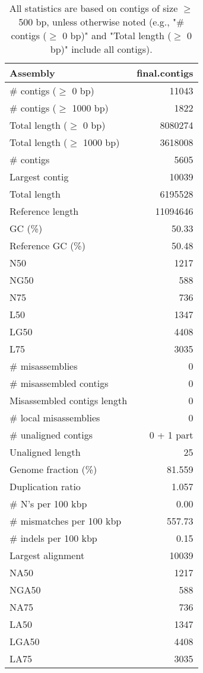 \documentclass[12pt,a4paper]{article}
\begin{document}
\begin{table}[ht]
\begin{center}
\caption{All statistics are based on contigs of size $\geq$ 500 bp, unless otherwise noted (e.g., "\# contigs ($\geq$ 0 bp)" and "Total length ($\geq$ 0 bp)" include all contigs).}
\begin{tabular}{|l*{1}{|r}|}
\hline
Assembly & final.contigs \\ \hline
\# contigs ($\geq$ 0 bp) & 11043 \\ \hline
\# contigs ($\geq$ 1000 bp) & 1822 \\ \hline
Total length ($\geq$ 0 bp) & 8080274 \\ \hline
Total length ($\geq$ 1000 bp) & 3618008 \\ \hline
\# contigs & 5605 \\ \hline
Largest contig & 10039 \\ \hline
Total length & 6195528 \\ \hline
Reference length & 11094646 \\ \hline
GC (\%) & 50.33 \\ \hline
Reference GC (\%) & 50.48 \\ \hline
N50 & 1217 \\ \hline
NG50 & 588 \\ \hline
N75 & 736 \\ \hline
L50 & 1347 \\ \hline
LG50 & 4408 \\ \hline
L75 & 3035 \\ \hline
\# misassemblies & 0 \\ \hline
\# misassembled contigs & 0 \\ \hline
Misassembled contigs length & 0 \\ \hline
\# local misassemblies & 0 \\ \hline
\# unaligned contigs & 0 + 1 part \\ \hline
Unaligned length & 25 \\ \hline
Genome fraction (\%) & 81.559 \\ \hline
Duplication ratio & 1.057 \\ \hline
\# N's per 100 kbp & 0.00 \\ \hline
\# mismatches per 100 kbp & 557.73 \\ \hline
\# indels per 100 kbp & 0.15 \\ \hline
Largest alignment & 10039 \\ \hline
NA50 & 1217 \\ \hline
NGA50 & 588 \\ \hline
NA75 & 736 \\ \hline
LA50 & 1347 \\ \hline
LGA50 & 4408 \\ \hline
LA75 & 3035 \\ \hline
\end{tabular}
\end{center}
\end{table}
\end{document}
